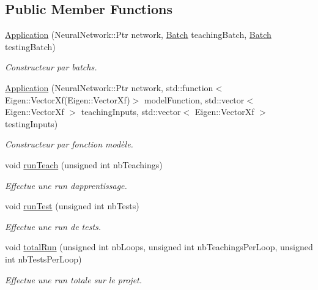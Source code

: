 \subsection*{Public Member Functions}
\begin{DoxyCompactItemize}
\item 
\hyperlink{classApplication_ab46d83da0e069b75ab971725bcf24a54}{Application} (Neural\+Network\+::\+Ptr network, \hyperlink{classApplication_a9888f02149ca3b8ffa499ee07426cd1d}{Batch} teaching\+Batch, \hyperlink{classApplication_a9888f02149ca3b8ffa499ee07426cd1d}{Batch} testing\+Batch)
\begin{DoxyCompactList}\small\item\em Constructeur par batchs. \end{DoxyCompactList}\item 
\hyperlink{classApplication_a662325bca303994250427110d5d771e7}{Application} (Neural\+Network\+::\+Ptr network, std\+::function$<$ Eigen\+::\+Vector\+Xf(Eigen\+::\+Vector\+Xf)$>$ model\+Function, std\+::vector$<$ Eigen\+::\+Vector\+Xf $>$ teaching\+Inputs, std\+::vector$<$ Eigen\+::\+Vector\+Xf $>$ testing\+Inputs)
\begin{DoxyCompactList}\small\item\em Constructeur par fonction modèle. \end{DoxyCompactList}\item 
void \hyperlink{classApplication_ae93c9eb1888c7b3bbab68aa5da50ce46}{run\+Teach} (unsigned int nb\+Teachings)
\begin{DoxyCompactList}\small\item\em Effectue une run d\textquotesingle{}apprentissage. \end{DoxyCompactList}\item 
void \hyperlink{classApplication_a2efd3cc253a127ea682a00b560f6d073}{run\+Test} (unsigned int nb\+Tests)
\begin{DoxyCompactList}\small\item\em Effectue une run de tests. \end{DoxyCompactList}\item 
void \hyperlink{classApplication_a105d173f14e444ddb485d5ac5df91d74}{total\+Run} (unsigned int nb\+Loops, unsigned int nb\+Teachings\+Per\+Loop, unsigned int nb\+Tests\+Per\+Loop)
\begin{DoxyCompactList}\small\item\em Effectue une run totale sur le projet. \end{DoxyCompactList}\end{DoxyCompactItemize}


